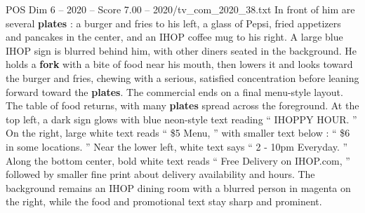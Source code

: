 \begin{textsample}{POS Dim 6 – 2020 – Score 7.00 – 2020/tv\_com\_2020\_38.txt}
In front of him are several \textbf{plates} : a burger and fries to his left, a glass of Pepsi, fried appetizers and pancakes in the center, and an IHOP coffee mug to his right.
A large blue IHOP sign is blurred behind him, with other diners seated in the background.
He holds a \textbf{fork} with a bite of food near his mouth, then lowers it and looks toward the burger and fries, chewing with a serious, satisfied concentration before leaning forward toward the \textbf{plates}.
The commercial ends on a final menu-style layout.
The table of food returns, with many \textbf{plates} spread across the foreground.
At the top left, a dark sign glows with blue neon-style text reading “ IHOPPY HOUR. ” On the right, large white text reads “ \$5 Menu, ” with smaller text below : “ \$6 in some locations. ” Near the lower left, white text says “ 2 - 10pm Everyday. ” Along the bottom center, bold white text reads “ Free Delivery on IHOP.com, ” followed by smaller fine print about delivery availability and hours.
The background remains an IHOP dining room with a blurred person in magenta on the right, while the food and promotional text stay sharp and prominent.

\end{textsample}
